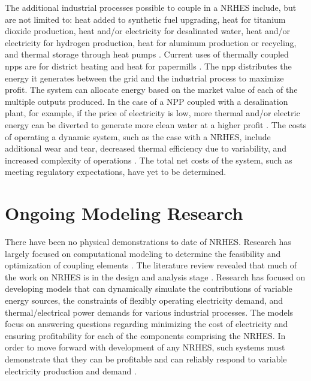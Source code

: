 The additional industrial processes possible to couple in a NRHES include, but are not limited to: heat added to synthetic fuel upgrading, heat for titanium dioxide production, heat and/or electricity for desalinated water, heat and/or electricity for hydrogen production, heat for aluminum production or recycling, and thermal storage through heat pumps \cite{Bienvenue2015}.  Current uses of thermally coupled \ac{npps} are for district heating and heat for papermills \cite{Verfondern}. The \ac{npp} distributes the energy it generates between the grid and the industrial process to maximize profit. The system can allocate energy based on the market value of each of the multiple outputs produced. In the case of a NPP coupled with a desalination plant, for example, if the price of electricity is low, more thermal and/or electric energy can be diverted to generate more clean water at a higher profit \cite {Chen2016}. The costs of operating a dynamic system, such as the case with a NRHES, include additional wear and tear, decreased thermal efficiency  due to variability, and increased complexity of operations  \cite{Garcia2013}. The total net costs of the system, such as meeting regulatory expectations, have yet to be determined.

\section{Ongoing Modeling Research}
There have been no physical demonstrations to date of NRHES. Research has largely focused on computational modeling to determine the feasibility and optimization of coupling elements \cite{Rabiti2015, Boardman2013, Shropshire2012}. The literature review revealed that much of the work on NRHES is in the design and analysis stage \cite{Epiney2016, Boardman2013, Shropshire2012}. Research has focused on developing models that can dynamically simulate the contributions of variable energy sources, the constraints of flexibly operating electricity demand, and thermal/electrical power demands for various industrial processes. The models focus on answering questions regarding minimizing the cost of electricity and ensuring profitability for each of the components comprising the NRHES. In order to move forward with development of any NRHES, such systems must demonstrate that they can be profitable and can reliably respond to variable electricity production and demand \cite{Rabiti2015}.

